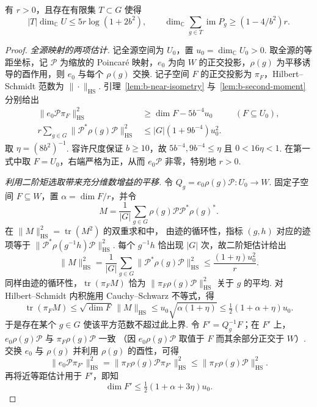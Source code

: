 \begin{theorem}
\label{thm:enough-forms}
\emitthmsource
有 $r>0$，且存在有限集 $T\subset G$ 使得
\begin{equation}
  |T|\dim_{\mathbb C}U\le 5r\log(1+2b^2),\qquad
  \dim_{\mathbb C}\sum_{g\in T}\operatorname{im}P_g
        \ge (1-4/b^2)r.
\label{eq:b-spanning}
\end{equation}
\end{theorem}
\begin{proof}
\emph{全源映射的两项估计.}
记全源空间为 $U_0$，置 $u_0=\dim_{\mathbb C}U_0>0$. 取全源的等距坐标，记 $\mathcal P$ 为缩放的 Poincaré 映射，$e_0$ 为向 $W$ 的正交投影，$\rho(g)$ 为平移诱导的酉作用，则 $e_0$ 与每个 $\rho(g)$ 交换. 记子空间 $F$ 的正交投影为 $\pi_F$，Hilbert--Schmidt 范数为 $\|\cdot\|_{\mathrm{HS}}$. 引理~\ref{lem:b-near-isometry} 与~\ref{lem:b-second-moment} 分别给出
\begin{align*}
 \|e_0\mathcal P\pi_F\|_{\mathrm{HS}}^2
 &\ge \dim F-5b^{-4}u_0 &&(F\subseteq U_0),\\
 r\sum_{g\in G}\|\mathcal P^*\rho(g)\mathcal P\|_{\mathrm{HS}}^2
 &\le |G|(1+9b^{-4})u_0^2.
\end{align*}
取 $\eta=(8b^2)^{-1}$. 容许尺度保证 $b\ge10$，故
$5b^{-4},9b^{-4}\le\eta$ 且 $0<16\eta<1$. 在第一式中取 $F=U_0$，右端严格为正，从而 $e_0\mathcal P$ 非零，特别地 $r>0$.

\emph{利用二阶矩选取带来充分维数增益的平移.}
令 $Q_g=e_0\rho(g)\mathcal P:U_0\to W$.
固定子空间 $F\subseteq W$，置 $\alpha=\dim F/r$，并令
\[
 M=\frac{1}{|G|}\sum_{g\in G}\rho(g)\mathcal P\mathcal P^*\rho(g)^* .
\]
在 $\|M\|_{\mathrm{HS}}^2=\operatorname{tr}(M^2)$ 的双重求和中，
由迹的循环性，指标 $(g,h)$ 对应的迹项等于
$\|\mathcal P^*\rho(g^{-1}h)\mathcal P\|_{\mathrm{HS}}^2$.
每个 $g^{-1}h$ 恰出现 $|G|$ 次，故二阶矩估计给出
\[
 \|M\|_{\mathrm{HS}}^2
 =\frac{1}{|G|}\sum_{g\in G}\|\mathcal P^*\rho(g)\mathcal P\|_{\mathrm{HS}}^2
 \le \frac{(1+\eta)u_0^2}{r}.
\]
同样由迹的循环性，$\operatorname{tr}(\pi_F M)$ 恰为
$\|\pi_F\rho(g)\mathcal P\|_{\mathrm{HS}}^2$ 关于 $g$ 的平均.
对 Hilbert--Schmidt 内积施用 Cauchy--Schwarz 不等式，得
\[
 \operatorname{tr}(\pi_F M)
 \le \sqrt{\dim F}\,\|M\|_{\mathrm{HS}}
 \le u_0\sqrt{\alpha(1+\eta)}
 \le \tfrac12(1+\alpha+\eta)u_0.
\]
于是存在某个 $g\in G$ 使该平方范数不超过此上界. 令 $F'=Q_g^{-1}F$；在 $F'$ 上，
$e_0\rho(g)\mathcal P$ 与 $\pi_F\rho(g)\mathcal P$ 一致
（因 $e_0\rho(g)\mathcal P$ 取值于 $F$ 而其余部分正交于 $W$）.
交换 $e_0$ 与 $\rho(g)$ 并利用 $\rho(g)$ 的酉性，可得
\[
 \|e_0\mathcal P\pi_{F'}\|_{\mathrm{HS}}^2
 =\|\pi_F\rho(g)\mathcal P\pi_{F'}\|_{\mathrm{HS}}^2
 \le\|\pi_F\rho(g)\mathcal P\|_{\mathrm{HS}}^2.
\]
再将近等距估计用于 $F'$，即知
\[
 \dim F'\le \tfrac12(1+\alpha+3\eta)u_0 .
\]


\end{proof}
